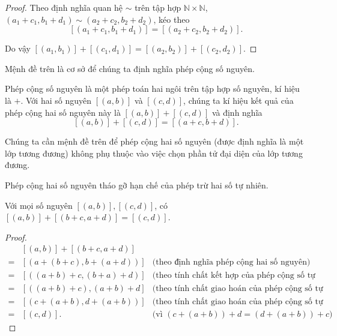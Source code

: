 \begin{proof}
    Theo định nghĩa quan hệ $\sim$ trên tập hợp $\mathbb{N}\times\mathbb{N}$, $(a_{1}+c_{1}, b_{1}+d_{1}) \sim (a_{2}+c_{2}, b_{2}+d_{2})$, kéo theo
    \[
        [(a_{1}+c_{1}, b_{1}+d_{1})] = [(a_{2}+c_{2}, b_{2}+d_{2})].
    \]

    Do vậy $[(a_{1}, b_{1})] + [(c_{1}, d_{1})] = [(a_{2}, b_{2})] + [(c_{2}, d_{2})]$.
\end{proof}

Mệnh đề trên là cơ sở để chúng ta định nghĩa phép cộng số nguyên.
\begin{definition}
    Phép cộng số nguyên là một phép toán hai ngôi trên tập hợp số nguyên, kí hiệu là $+$. Với hai số nguyên $[(a, b)]$ và $[(c, d)]$, chúng ta kí hiệu kết quả của phép cộng hai số nguyên này là $[(a, b)] + [(c, d)]$ và định nghĩa
    \[
        [(a, b)] + [(c, d)] = [(a+c, b+d)].
    \]
\end{definition}

Chúng ta cần mệnh đề trên để phép cộng hai số nguyên (được định nghĩa là một lớp tương đương) không phụ thuộc vào việc chọn phần tử đại diện của lớp tương đương.

Phép cộng hai số nguyên tháo gỡ hạn chế của phép trừ hai số tự nhiên.
\begin{proposition}
    Với mọi số nguyên $[(a, b)], [(c, d)]$, có $[(a, b)] + [(b+c, a+d)] = [(c, d)]$.
\end{proposition}

\begin{proof}
    \begin{align*}
          & [(a, b)] + [(b+c, a+d)]                                                               \\
        = & [(a+(b+c), b+(a+d))]    & \text{(theo định nghĩa phép cộng hai số nguyên)}            \\
        = & [((a+b)+c, (b+a)+d)]    & \text{(theo tính chất kết hợp của phép cộng số tự nhiên)}   \\
        = & [((a+b)+c), (a+b)+d]    & \text{(theo tính chất giao hoán của phép cộng số tự nhiên)} \\
        = & [(c+(a+b), d+(a+b))]    & \text{(theo tính chất giao hoán của phép cộng số tự nhiên)} \\
        = & [(c, d)].               & \text{(vì $(c+(a+b))+d = (d+(a+b))+c$)}
    \end{align*}
\end{proof}

